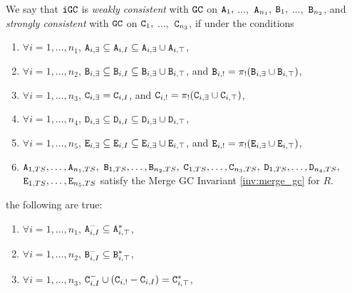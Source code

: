 \begin{property}
We say that $\tt{iGC}$ is \emph{weakly consistent} with $\tt{GC}$ on $\tt{A}_1,$ $\dots,$ $\tt{A}_{n_1},$ $\tt{B}_1,$ $\dots,$ $\tt{B}_{n_2}$, and \emph{strongly consistent} with $\tt{GC}$ on $\tt{C}_1,$ $\dots,$ $\tt{C}_{n_3}$, if under the conditions
\begin{enumerate}
\item $\forall i=1,\dots,n_1$, $\tt{A}_{i,\exists} \subseteq \tt{A}_{i,I} \subseteq \tt{A}_{i,\exists} \cup \tt{A}_{i,\top}$,
\item $\forall i=1,\dots,n_2$, $\tt{B}_{i,\exists} \subseteq \tt{B}_{i,I} \subseteq \tt{B}_{i,\exists} \cup \tt{B}_{i,\top}$, and $\tt{B}_{i,!} = \pi_!(\tt{B}_{i,\exists} \cup \tt{B}_{i,\top})$,
\item $\forall i=1,\dots,n_3$, $\tt{C}_{i,\exists} =         \tt{C}_{i,I}$,                                                   and $\tt{C}_{i,!} = \pi_!(\tt{C}_{i,\exists} \cup \tt{C}_{i,\top})$,
\item $\forall i=1,\dots,n_4$, $\tt{D}_{i,\exists} \subseteq \tt{D}_{i,I} \subseteq \tt{D}_{i,\exists} \cup \tt{D}_{i,\top}$,
\item $\forall i=1,\dots,n_5$, $\tt{E}_{i,\exists} \subseteq \tt{E}_{i,I} \subseteq \tt{E}_{i,\exists} \cup \tt{E}_{i,\top}$, and $\tt{E}_{i,!} = \pi_!(\tt{E}_{i,\exists} \cup \tt{E}_{i,\top})$,
\item $\tt{A}_{1,TS}, \dots, \tt{A}_{n_1,TS},$ $\tt{B}_{1,TS}, \dots, \tt{B}_{n_2,TS},$ $\tt{C}_{1,TS}, \dots, \tt{C}_{n_3,TS},$ $\tt{D}_{1,TS}, \dots, \tt{D}_{n_4,TS},$ $\tt{E}_{1,TS}, \dots, \tt{E}_{n_5,TS}$ satisfy the Merge GC Invariant \ref{inv:merge_gc} for $R$.
\end{enumerate}
the following are true:
\begin{enumerate}
\item $\forall i=1,\dots,n_1$, $\tt{A}_{i,I}^- \subseteq \tt{A}_{i,\top}^*$,
\item $\forall i=1,\dots,n_2$, $\tt{B}_{i,I}^- \subseteq \tt{B}_{i,\top}^*$,
\item $\forall i=1,\dots,n_3$, $\tt{C}_{i,I}^- \cup (\tt{C}_{i,!} - \tt{C}_{i,I}) =         \tt{C}_{i,\top}^*$,
\end{enumerate}
\end{property}


